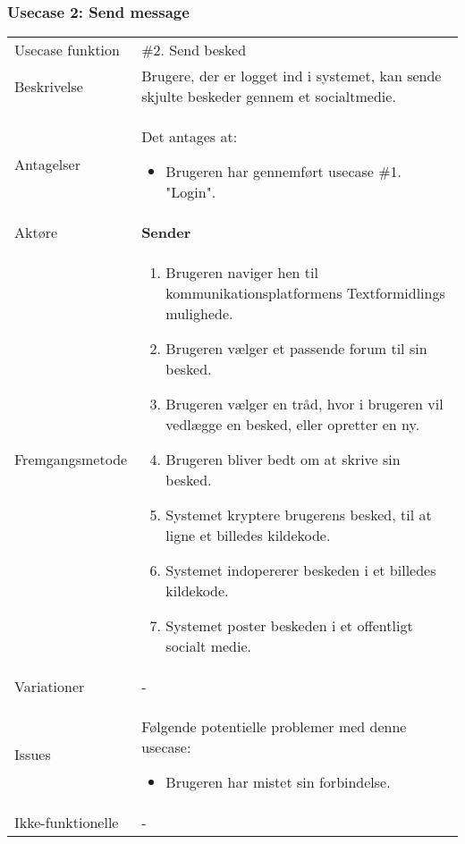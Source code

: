 \subsubsection{Usecase 2: Send message \label{Usecase2_Send_Message}}
\begin{tabular}{@{}p{3.5cm}@{}p{13cm}@{}}
    Usecase funktion & 
    \#2. Send besked \\
    Beskrivelse & 
    Brugere, der er logget ind i systemet, kan sende skjulte beskeder gennem et socialtmedie. \\
    Antagelser & 
    Det antages at:
    \begin{itemize}
        \item Brugeren har gennemført usecase \#1. "Login".
    \end{itemize}\\
    Aktøre & 
    \textbf{Sender} \\
    Fremgangsmetode &
    \begin{enumerate}
        \item Brugeren naviger hen til kommunikationsplatformens Textformidlings mulighede.
        \item Brugeren vælger et passende forum til sin besked.
        \item Brugeren vælger en tråd, hvor i brugeren vil vedlægge en besked, eller opretter en ny.
        \item Brugeren bliver bedt om at skrive sin besked.
        \item Systemet kryptere brugerens besked, til at ligne et billedes kildekode.
        \item Systemet indopererer beskeden i et billedes kildekode.
        \item Systemet poster beskeden i et offentligt socialt medie.
    \end{enumerate} \\
    Variationer & 
    - \\
    Issues &
    Følgende potentielle problemer med denne usecase:
    \begin{itemize}
        \item Brugeren har mistet sin forbindelse.
    \end{itemize}\\
    Ikke-funktionelle & 
    -
\end{tabular}
\newpage
